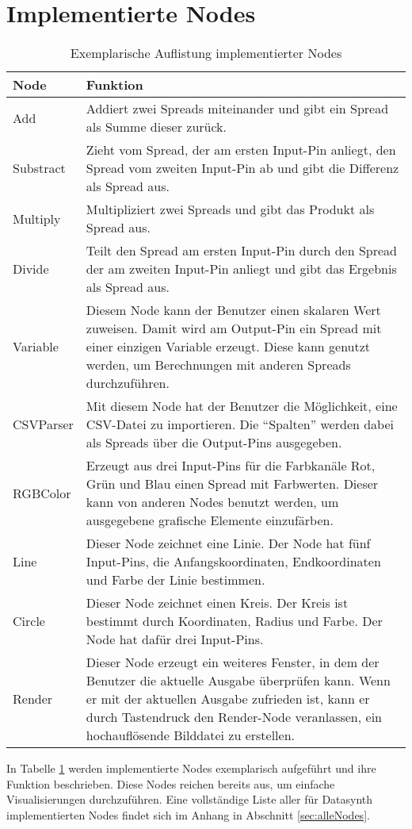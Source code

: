 \documentclass[a4paper, 
               12pt,
               DIV=calc,
               version=first,
               pdftex,
               headsepline,
               footsepline,
               bibtotocnumbered,
               liststotocnumbered]{scrreprt}
\begin{document}
\section{Implementierte Nodes}
\label{sec:ImplementierteNodes}
\begin{table}
\centering
\begin{tabular}{|l|p{10cm}|}
\hline
\textbf{Node} & \textbf{Funktion}\\
\hline
Add & Addiert zwei Spreads miteinander und gibt ein Spread als Summe dieser zurück.\\
\hline
Substract & Zieht vom Spread, der am ersten Input-Pin anliegt, den Spread vom zweiten Input-Pin ab und gibt die Differenz als Spread aus.\\
\hline
Multiply & Multipliziert zwei Spreads und gibt das Produkt als Spread aus.\\
\hline
Divide & Teilt den Spread am ersten Input-Pin durch den Spread der am zweiten Input-Pin anliegt und gibt das Ergebnis als Spread aus.\\
\hline
Variable & Diesem Node kann der Benutzer einen skalaren Wert zuweisen. Damit wird am Output-Pin ein Spread mit einer einzigen
Variable erzeugt. Diese kann genutzt werden, um Berechnungen mit anderen Spreads durchzuführen.\\
\hline
CSVParser & Mit diesem Node hat der Benutzer die Möglichkeit, eine CSV-Datei zu importieren.
Die "`Spalten"' werden dabei als Spreads über die Output-Pins ausgegeben.\\
\hline
RGBColor & Erzeugt aus drei Input-Pins für die Farbkanäle Rot, Grün und Blau einen Spread mit Farbwerten. Dieser
kann von anderen Nodes benutzt werden, um ausgegebene grafische Elemente einzufärben.\\
\hline
Line & Dieser Node zeichnet eine Linie. Der Node hat fünf Input-Pins, die Anfangskoordinaten, Endkoordinaten und Farbe
der Linie bestimmen.\\
\hline
Circle & Dieser Node zeichnet einen Kreis. Der Kreis ist bestimmt durch Koordinaten, Radius und Farbe. Der Node
hat dafür drei Input-Pins.\\
\hline
Render & Dieser Node erzeugt ein weiteres Fenster, in dem der Benutzer die aktuelle Ausgabe überprüfen kann.
Wenn er mit der aktuellen Ausgabe zufrieden ist, kann er durch Tastendruck den Render-Node veranlassen, ein
hochauflösende Bilddatei zu erstellen.\\
\hline
\end{tabular}
\caption{Exemplarische Auflistung implementierter Nodes}
\label{tab:nodes}
\end{table}
In Tabelle \ref{tab:nodes} werden implementierte Nodes exemplarisch aufgeführt und ihre Funktion beschrieben.
Diese Nodes reichen bereits aus, um einfache Visualisierungen durchzuführen. Eine vollständige Liste aller
für Datasynth implementierten Nodes findet sich im Anhang in Abschnitt \ref{sec:alleNodes}.
\end{document}
